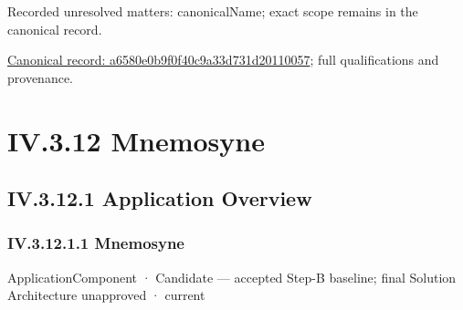 {\small Recorded unresolved matters: canonicalName; exact scope remains in the canonical record.}\par
{\footnotesize \href{../../../../continuum/application/application-function/a6580e0b9f0f40c9a33d731d20110057.md}{Canonical record: a6580e0b9f0f40c9a33d731d20110057}; full qualifications and provenance.}\par
\section*{IV.3.12 Mnemosyne}
\label{navigation:IV.3.12}

\subsection*{IV.3.12.1 Application Overview}
\label{navigation:IV.3.12.1}

\subsubsection*{IV.3.12.1.1 Mnemosyne}
\label{navigation:IV.3.12.1.1}

\label{element:7985e647bf9e4ca3ba70faf9e3e4ae02}
{\small ApplicationComponent · Candidate — accepted Step-B baseline; final Solution Architecture unapproved · current}\par


